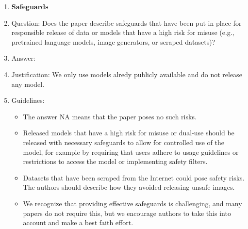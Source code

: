 \documentclass{article}
\begin{document}
\begin{enumerate}
\item {\bf Safeguards}
    \item[] Question: Does the paper describe safeguards that have been put in place for responsible release of data or models that have a high risk for misuse (e.g., pretrained language models, image generators, or scraped datasets)?
    \item[] Answer: \answerNA{} %
    \item[] Justification: We only use models alredy publicly available and do not release any model.
    \item[] Guidelines:
    \begin{itemize}
        \item The answer NA means that the paper poses no such risks.
        \item Released models that have a high risk for misuse or dual-use should be released with necessary safeguards to allow for controlled use of the model, for example by requiring that users adhere to usage guidelines or restrictions to access the model or implementing safety filters. 
        \item Datasets that have been scraped from the Internet could pose safety risks. The authors should describe how they avoided releasing unsafe images.
        \item We recognize that providing effective safeguards is challenging, and many papers do not require this, but we encourage authors to take this into account and make a best faith effort.
    \end{itemize}


\end{enumerate}
\end{document}
